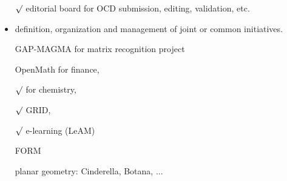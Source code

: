 \documentclass{euproposal}
\begin{document}
\begin{itemize}
$\surd$ editorial board for OCD submission, editing, validation, etc.

\item definition, organization and management of joint or common
  initiatives.

GAP-MAGMA for matrix recognition project

OpenMath for finance,

$\surd$ for chemistry, 

$\surd$ GRID, 

$\surd$ e-learning (LeAM) 

FORM

planar geometry: Cinderella, Botana, ...



\end{itemize}
\end{document}
